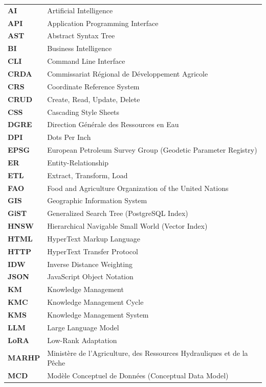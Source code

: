 \documentclass[12pt,a4paper]{report}
\begin{document}
\begin{longtable}{ll}
\textbf{AI} & Artificial Intelligence \\
\textbf{API} & Application Programming Interface \\
\textbf{AST} & Abstract Syntax Tree \\
\textbf{BI} & Business Intelligence \\
\textbf{CLI} & Command Line Interface \\
\textbf{CRDA} & Commissariat Régional de Développement Agricole \\
\textbf{CRS} & Coordinate Reference System \\
\textbf{CRUD} & Create, Read, Update, Delete \\
\textbf{CSS} & Cascading Style Sheets \\
\textbf{DGRE} & Direction Générale des Ressources en Eau \\
\textbf{DPI} & Dots Per Inch \\
\textbf{EPSG} & European Petroleum Survey Group (Geodetic Parameter Registry) \\
\textbf{ER} & Entity-Relationship \\
\textbf{ETL} & Extract, Transform, Load \\
\textbf{FAO} & Food and Agriculture Organization of the United Nations \\
\textbf{GIS} & Geographic Information System \\
\textbf{GiST} & Generalized Search Tree (PostgreSQL Index) \\
\textbf{HNSW} & Hierarchical Navigable Small World (Vector Index) \\
\textbf{HTML} & HyperText Markup Language \\
\textbf{HTTP} & HyperText Transfer Protocol \\
\textbf{IDW} & Inverse Distance Weighting \\
\textbf{JSON} & JavaScript Object Notation \\
\textbf{KM} & Knowledge Management \\
\textbf{KMC} & Knowledge Management Cycle \\
\textbf{KMS} & Knowledge Management System \\
\textbf{LLM} & Large Language Model \\
\textbf{LoRA} & Low-Rank Adaptation \\
\textbf{MARHP} & Ministère de l'Agriculture, des Ressources Hydrauliques et de la Pêche \\
\textbf{MCD} & Modèle Conceptuel de Données (Conceptual Data Model) \\

\end{longtable}
\end{document}
